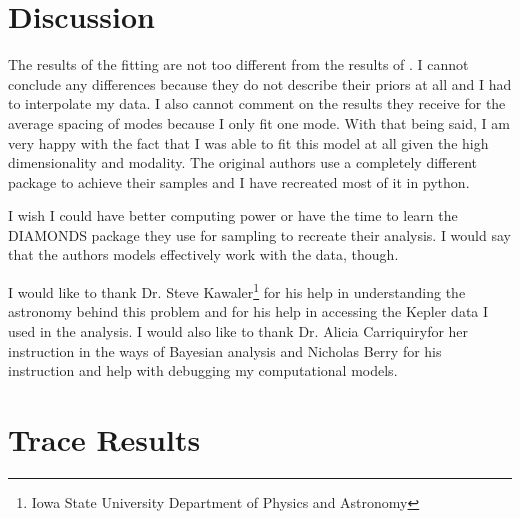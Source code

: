 \documentclass[
    aip,
    jmp,
    reprint,
    nofootinbib,
    floatfix
    ]{revtex4-1}
\begin{document}
    \section{Discussion}

    The results of the fitting are not too different from the results of \citet{li}. I cannot conclude any differences because they do not describe their priors at all and I had to interpolate my data. I also cannot comment on the results they receive for the average spacing of modes because I only fit one mode. With that being said, I am very happy with the fact that I was able to fit this model at all given the high dimensionality and modality. The original authors use a completely different package to achieve their samples and I have recreated most of it in python. 

    I wish I could have better computing power or have the time to learn the DIAMONDS package they use for sampling to recreate their analysis. I would say that the authors models effectively work with the data, though.

    \begin{acknowledgements}
        I would like to thank Dr. Steve Kawaler\footnote{Iowa State University Department of Physics and Astronomy} for his help in understanding the astronomy behind this problem and for his help in accessing the Kepler data I used in the analysis. I would also like to thank Dr. Alicia Carriquiry\footnotemark for her instruction in the ways of Bayesian analysis and Nicholas Berry \footnotemark[\value{footnote}] for his instruction and help with debugging my computational models.

    \end{acknowledgements}

    
    \appendix*

    \section{Trace Results}
\end{document}

